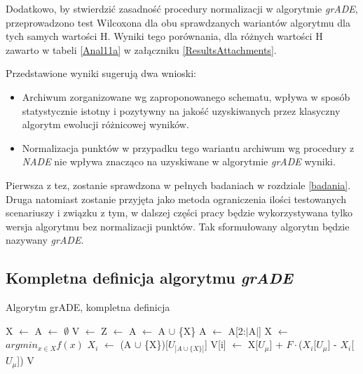 \documentclass[12pt,a4paper]{report}
\begin{document}
{{{{{{{\par{
Dodatkowo, by stwierdzić zasadność procedury normalizacji w algorytmie \emph{grADE}, przeprowadzono test Wilcoxona dla obu sprawdzanych wariantów algorytmu dla tych samych wartości H. Wyniki tego porównania, dla różnych wartości H zawarto w tabeli \ref{Anal11a} w załączniku \ref{ResultsAttachments}.
}
\par{
Przedstawione wyniki sugerują dwa wnioski:
\begin{itemize}
\item Archiwum zorganizowane wg zaproponowanego schematu, wpływa w sposób statystycznie istotny i pozytywny na jakość uzyskiwanych przez klasyczny algorytm ewolucji różnicowej wyników.
\item Normalizacja punktów w przypadku tego wariantu archiwum wg procedury z \emph{NADE} nie wpływa znacząco na uzyskiwane w algorytmie \emph{grADE} wyniki.
\end{itemize}
}
\par{
Pierwsza z tez, zostanie sprawdzona w pełnych badaniach w rozdziale \ref{badania}. Druga natomiast zostanie przyjęta jako metoda ograniczenia ilości testowanych scenariuszy i związku z tym, w dalszej części pracy będzie wykorzystywana tylko wersja algorytmu bez normalizacji punktów. Tak sformułowany algorytm będzie nazywany \emph{grADE}.
}

\subsection{Kompletna definicja algorytmu \emph{grADE}}
\begin{algorithm}[H]
\caption{Algorytm grADE, kompletna definicja}
\label{algorithm:grade}
\begin{algorithmic}[1]
    \State X $\gets$ 
    \State A $\gets$ $\emptyset$
	    \State V $\gets$ 
        \State Z $\gets$ 
        \State A $\gets$ A $\cup$ \{X\}
	        \State A $\gets$ A[2:$|$A$|$]
        \EndIf
        \State X $\gets$ 
    \EndWhile
    \State \Return $argmin_{x \in X} f(x)$
\EndFunction
\State
{}
    	\State $X_i$ $\gets$ (A $\cup$ \{X\})[$U_{|A \cup \{X\}|}$]
	   	\State V[i] $\gets$ X[$U_\mu$] + $F \cdot $($X_i$[$U_\mu$] - $X_i$[$U_\mu$])
    \EndFor
    \State \Return V
\EndFunction
\end{algorithmic}
\end{algorithm}


}}}}}}}
\end{document}
